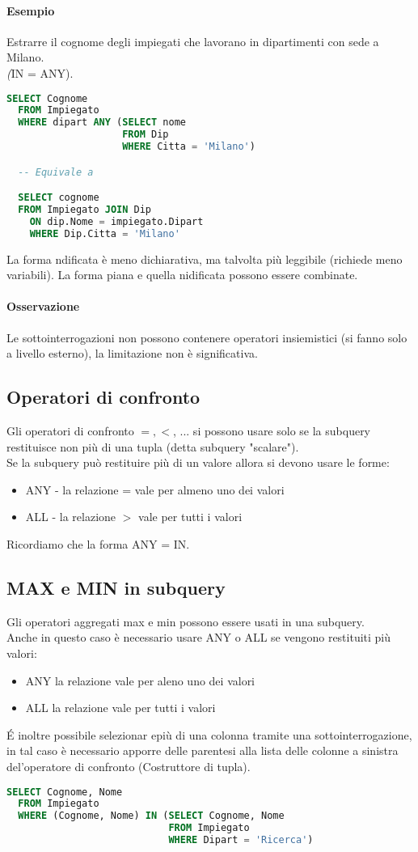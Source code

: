 \paragraph*{Esempio} Estrarre il cognome degli impiegati che lavorano in dipartimenti con
sede a Milano.\\
\textit(IN = ANY).
\begin{lstlisting}[language=SQL]
  SELECT Cognome
  FROM Impiegato
  WHERE dipart ANY (SELECT nome
                    FROM Dip
                    WHERE Citta = 'Milano')

  -- Equivale a

  SELECT cognome
  FROM Impiegato JOIN Dip
    ON dip.Nome = impiegato.Dipart
    WHERE Dip.Citta = 'Milano'
\end{lstlisting}
La forma ndificata è meno dichiarativa, ma talvolta  più leggibile (richiede meno variabili).
La forma piana e quella nidificata possono essere combinate.
\paragraph*{Osservazione} Le sottointerrogazioni non possono contenere operatori insiemistici (si fanno
solo a livello esterno), la limitazione non è significativa.
\subsection{Operatori di confronto}
Gli operatori di confronto $=, <$, ... si possono usare solo se la subquery restituisce
non più di una tupla (detta subquery "scalare").\\
Se la subquery può restituire più di un valore allora si devono usare le forme:
\begin{itemize}
  \item ANY - la relazione = vale per almeno uno dei valori
  \item ALL - la relazione $>$ vale per tutti i valori
\end{itemize}
Ricordiamo che la forma ANY = IN.
\subsection{MAX e MIN in subquery}
Gli operatori aggregati max e min possono essere usati in una subquery.\\
Anche in questo caso è necessario usare ANY o ALL se vengono restituiti più valori:
\begin{itemize}
  \item ANY la relazione vale per aleno uno dei valori
  \item ALL la relazione vale per tutti i valori
\end{itemize}
\'E inoltre possibile selezionar epiù di una colonna tramite una sottointerrogazione, 
in tal caso è necessario apporre delle parentesi alla lista delle colonne a sinistra
del'operatore di confronto (Costruttore di tupla).
\begin{lstlisting}[language=SQL]
  SELECT Cognome, Nome
  FROM Impiegato
  WHERE (Cognome, Nome) IN (SELECT Cognome, Nome
                            FROM Impiegato
                            WHERE Dipart = 'Ricerca')
\end{lstlisting}
